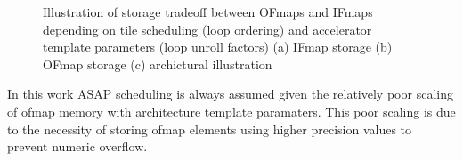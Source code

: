 \begin{figure}
    \centering
    \hspace{0.1cm} 
    \caption{Illustration of storage tradeoff between OFmaps and IFmaps depending on tile scheduling (loop ordering) and accelerator template parameters (loop unroll factors) (a) IFmap storage (b) OFmap storage (c) archictural illustration}
    \label{fig:Fmap_scaling}
\end{figure}

In this work ASAP scheduling is always assumed given the relatively poor scaling
of ofmap memory with architecture template paramaters. This poor scaling is due
to the necessity of storing ofmap elements using higher precision values to
prevent numeric overflow. 


